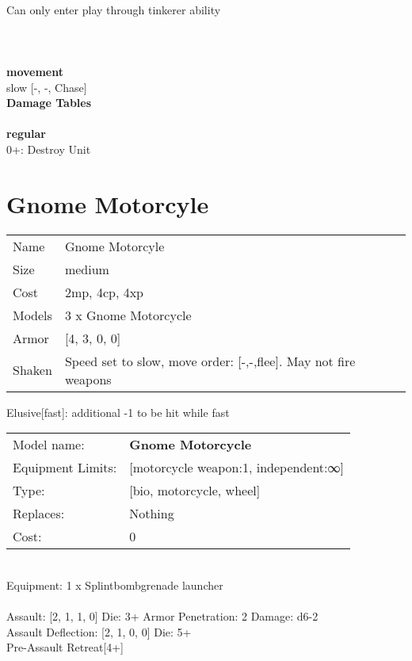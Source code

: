 \ \\
Can only enter play through tinkerer ability\\ 

\ \\
 
\ \\



\ \\ {\bf movement } \\
slow [-, -, Chase] \\


{\bf Damage Tables} \\
\ \\ {\bf regular } \\
0+: Destroy Unit \\










\pagebreak\pagebreak

\section{ Gnome Motorcyle }

\begin{tabular}{ll}
  Name & Gnome Motorcyle \\
  Size & medium\\
  Cost & 2mp, 4cp, 4xp\\
  Models & 3 x Gnome Motorcycle\\
  Armor & [4, 3, 0, 0]\\
  Shaken & Speed set to slow, move order: [-,-,flee]. May not fire weapons\\
\end{tabular}

\noindent Elusive[fast]: additional -1 to be hit while fast\\ 


\noindent
\begin{tabular}{ll}
Model name: &{\bf Gnome Motorcycle } \\
Equipment Limits: &[motorcycle weapon:1, independent:∞] \\
Type: &[bio, motorcycle, wheel] \\
Replaces: &Nothing \\
Cost: & 0\\
\end{tabular}
\ \\
Equipment: 1 x Splintbombgrenade launcher \\
\ \\
Assault: [2, 1, 1, 0] Die: 3+ Armor Penetration: 2 Damage: d6-2 \\
Assault Deflection: [2, 1, 0, 0] Die: 5+\\
\indent Pre-Assault Retreat[4+]\\ 
 

